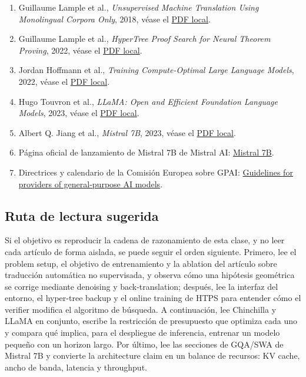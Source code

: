 \documentclass[a4paper]{article}
\begin{document}
\begin{enumerate}
  \item Guillaume Lample et al., \emph{Unsupervised Machine Translation Using Monolingual Corpora Only}, 2018, véase el \href{run:source-materials/unsupervised-machine-translation.pdf}{PDF local}.
  \item Guillaume Lample et al., \emph{HyperTree Proof Search for Neural Theorem Proving}, 2022, véase el \href{run:source-materials/hypertree-proof-search.pdf}{PDF local}.
  \item Jordan Hoffmann et al., \emph{Training Compute-Optimal Large Language Models}, 2022, véase el \href{run:source-materials/chinchilla-scaling-laws.pdf}{PDF local}.
  \item Hugo Touvron et al., \emph{LLaMA: Open and Efficient Foundation Language Models}, 2023, véase el \href{run:source-materials/llama.pdf}{PDF local}.
  \item Albert Q. Jiang et al., \emph{Mistral 7B}, 2023, véase el \href{run:source-materials/mistral-7b.pdf}{PDF local}.
  \item Página oficial de lanzamiento de Mistral 7B de Mistral AI: \href{https://mistral.ai/news/announcing-mistral-7b}{Mistral 7B}.
  \item Directrices y calendario de la Comisión Europea sobre GPAI: \href{https://digital-strategy.ec.europa.eu/en/policies/guidelines-gpai-providers}{Guidelines for providers of general-purpose AI models}.
\end{enumerate}

\subsection{Ruta de lectura sugerida}

Si el objetivo es reproducir la cadena de razonamiento de esta clase, y no leer cada artículo de forma aislada, se puede seguir el orden siguiente. Primero, lee el problem setup, el objetivo de entrenamiento y la ablation del artículo sobre traducción automática no supervisada, y observa cómo una hipótesis geométrica se corrige mediante denoising y back-translation; después, lee la interfaz del entorno, el hyper-tree backup y el online training de HTPS para entender cómo el verifier modifica el algoritmo de búsqueda. A continuación, lee Chinchilla y LLaMA en conjunto, escribe la restricción de presupuesto que optimiza cada uno y compara qué implica, para el despliegue de inferencia, entrenar un modelo pequeño con un horizon largo. Por último, lee las secciones de GQA/SWA de Mistral 7B y convierte la architecture claim en un balance de recursos: KV cache, ancho de banda, latencia y throughput.
\end{document}
